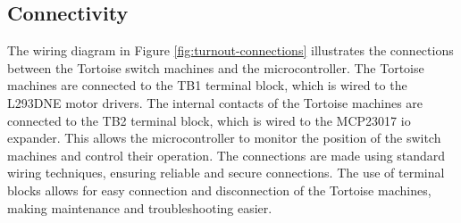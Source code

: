 \subsection{Connectivity}
The wiring diagram in Figure \ref{fig:turnout-connections} illustrates the connections between the Tortoise switch machines and the microcontroller. The Tortoise machines are connected to the TB1 terminal block, which is wired to the L293DNE motor drivers.
The internal contacts of the Tortoise machines are connected to the TB2 terminal block, which is wired to the MCP23017 \gls{io} expander. This allows the microcontroller to monitor the position of the switch machines and control their operation.
The connections are made using standard wiring techniques, ensuring reliable and secure connections. The use of terminal blocks allows for easy connection and disconnection of the Tortoise machines, making maintenance and troubleshooting easier.
